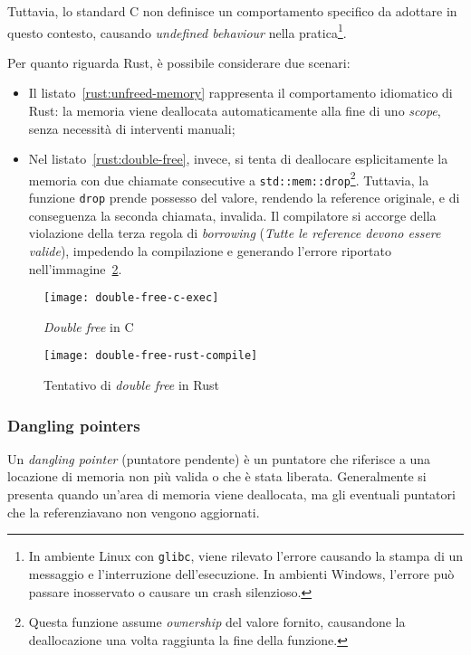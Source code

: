 Tuttavia, lo standard C non definisce un comportamento specifico da adottare in questo contesto, causando 
\textit{undefined behaviour} nella pratica\footnote{In ambiente Linux con \texttt{glibc}, viene rilevato l'errore causando
 la stampa di un messaggio e l'interruzione dell'esecuzione. In ambienti Windows, l'errore può passare inosservato o causare un crash silenzioso.}.

Per quanto riguarda Rust, è possibile considerare due scenari: 
\begin{itemize}
    \item Il listato~\ref{rust:unfreed-memory} rappresenta il comportamento idiomatico di Rust: la memoria viene deallocata automaticamente alla fine di uno \textit{scope}, senza necessità di interventi manuali;
    \item Nel listato~\ref{rust:double-free}, invece, si tenta di deallocare esplicitamente la memoria con due chiamate consecutive a \texttt{std::mem::drop}\footnote{Questa funzione assume \textit{ownership} del valore fornito, causandone la deallocazione una volta raggiunta la fine della funzione.}. Tuttavia, la funzione \texttt{drop} prende possesso del valore, rendendo la reference originale, e di conseguenza la seconda chiamata, invalida. Il compilatore si accorge della violazione della terza regola di \textit{borrowing} (\textit{Tutte le reference devono essere valide}), impedendo la compilazione e generando l'errore riportato nell'immagine~\ref{rust:double-free-compile}.
\end{itemize}
\begin{figure}[htbp]
\begin{center}
    \texttt{[image: double-free-c-exec]}
    \caption{\textit{Double free} in C}\label{c:double-free-exec}
    \end{center}
\end{figure}
\begin{figure}[htbp]
\begin{center}
    \texttt{[image: double-free-rust-compile]}
    \caption{Tentativo di \textit{double free} in Rust}\label{rust:double-free-compile}
    \end{center}
\end{figure}

\subsubsection{Dangling pointers}
Un \textit{dangling pointer} (puntatore pendente) è un puntatore che riferisce a una locazione di memoria non più valida o che è stata liberata. 
Generalmente si presenta quando un'area di memoria viene deallocata, ma gli eventuali puntatori che la referenziavano non vengono aggiornati.

